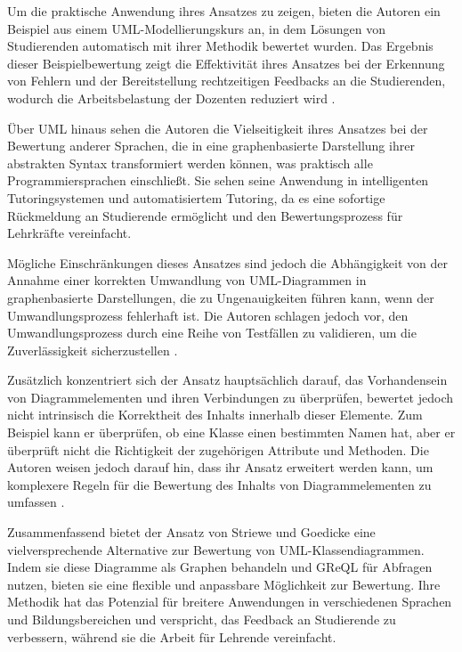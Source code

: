 Um die praktische Anwendung ihres Ansatzes zu zeigen, bieten die Autoren ein Beispiel aus einem UML-Modellierungskurs an, in dem Lösungen von Studierenden automatisch mit ihrer Methodik bewertet wurden. Das Ergebnis dieser Beispielbewertung zeigt die Effektivität ihres Ansatzes bei der Erkennung von Fehlern und der Bereitstellung rechtzeitigen Feedbacks an die Studierenden, wodurch die Arbeitsbelastung der Dozenten reduziert wird \cite{striewe2011automated}.

Über UML hinaus sehen die Autoren die Vielseitigkeit ihres Ansatzes bei der Bewertung anderer Sprachen, die in eine graphenbasierte Darstellung ihrer abstrakten Syntax transformiert werden können, was praktisch alle Programmiersprachen einschließt. Sie sehen seine Anwendung in intelligenten Tutoringsystemen und automatisiertem Tutoring, da es eine sofortige Rückmeldung an Studierende ermöglicht und den Bewertungsprozess für Lehrkräfte vereinfacht.

Mögliche Einschränkungen dieses Ansatzes sind jedoch die Abhängigkeit von der Annahme einer korrekten Umwandlung von UML-Diagrammen in graphenbasierte Darstellungen, die zu Ungenauigkeiten führen kann, wenn der Umwandlungsprozess fehlerhaft ist. Die Autoren schlagen jedoch vor, den Umwandlungsprozess durch eine Reihe von Testfällen zu validieren, um die Zuverlässigkeit sicherzustellen \cite{striewe2011automated}.

Zusätzlich konzentriert sich der Ansatz hauptsächlich darauf, das Vorhandensein von Diagrammelementen und ihren Verbindungen zu überprüfen, bewertet jedoch nicht intrinsisch die Korrektheit des Inhalts innerhalb dieser Elemente. Zum Beispiel kann er überprüfen, ob eine Klasse einen bestimmten Namen hat, aber er überprüft nicht die Richtigkeit der zugehörigen Attribute und Methoden. Die Autoren weisen jedoch darauf hin, dass ihr Ansatz erweitert werden kann, um komplexere Regeln für die Bewertung des Inhalts von Diagrammelementen zu umfassen \cite{striewe2014automated}.

Zusammenfassend bietet der Ansatz von Striewe und Goedicke eine vielversprechende Alternative zur Bewertung von UML-Klassendiagrammen. Indem sie diese Diagramme als Graphen behandeln und \ac{GReQL} für Abfragen nutzen, bieten sie eine flexible und anpassbare Möglichkeit zur Bewertung. Ihre Methodik hat das Potenzial für breitere Anwendungen in verschiedenen Sprachen und Bildungsbereichen und verspricht, das Feedback an Studierende zu verbessern, während sie die Arbeit für Lehrende vereinfacht.


